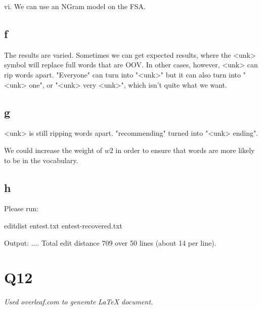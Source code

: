 \documentclass[12pt, letterpaper]{article}
\begin{document}
vi. We can use an NGram model on the FSA. 

\subsection{f}
The results are varied. Sometimes we can get expected results, where the <unk> symbol will replace full words that are OOV. 
In other cases, however, <unk> can rip words apart. "Everyone" can turn into "<unk>" but it can also turn into "<unk> one", or "<unk> very <unk>", which isn't quite what we want.

\subsection{g}
<unk> is still ripping words apart. "recommending" turned into "<unk> ending". 

We could increase the weight of $w2$ in order to ensure that words are more likely to be in the vocabulary.

\subsection{h}
Please run:

editdist entest.txt entest-recovered.txt

Output:
....
Total edit distance 709 over 50 lines (about 14 per line).

\section{Q12}

\begin{center}
\textit{Used overleaf.com to generate LaTeX document.}
\end{center}
\end{document}
